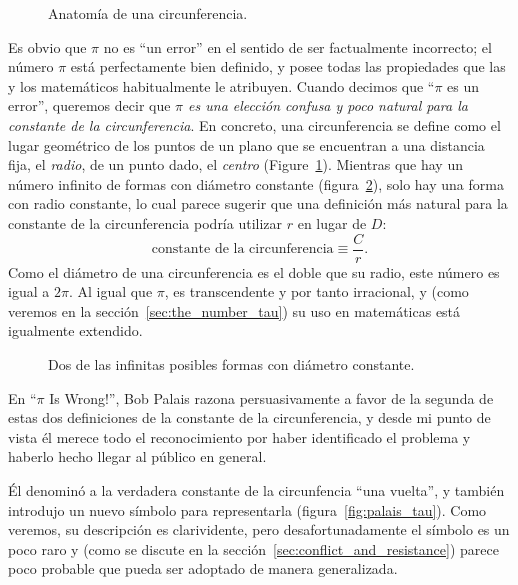 \begin{figure}
\caption{Anatomía de una circunferencia.\label{fig:circle}}
\end{figure}

Es obvio que $\pi$ no es ``un error'' en el sentido de ser factualmente incorrecto; el número $\pi$ está perfectamente bien definido, y posee todas las propiedades que las y los matemáticos habitualmente le atribuyen. Cuando decimos que ``$\pi$ es un error'', queremos decir que \emph{$\pi$ es una elección confusa y poco natural para la constante de la circunferencia}. En concreto, una circunferencia se define como el lugar geométrico de los puntos de un plano que se encuentran a una distancia fija, el \emph{radio}, de un punto dado, el \emph{centro} (Figure~\ref{fig:circle}). Mientras que hay un número infinito de formas con diámetro constante (figura~\ref{fig:bicycle_constant_diameters}), solo hay una forma con radio constante, lo cual parece sugerir que una definición más natural para la constante de la circunferencia podría utilizar $r$ en lugar de $D$:
\begin{equation}
\label{eq:circle_constant}
\mbox{constante de la circunferencia} \equiv \frac{C}{r}.
\end{equation}
Como el diámetro de una circunferencia es el doble que su radio, este número es igual a $2\pi$. Al igual que $\pi$, es transcendente y por tanto irracional, y (como veremos en la sección~\ref{sec:the_number_tau}) su uso en matemáticas está igualmente extendido.

\begin{figure}
\caption{Dos de las infinitas posibles formas con diámetro constante.\label{fig:bicycle_constant_diameters}}
\end{figure}

En ``$\pi$ Is Wrong!'', Bob Palais razona persuasivamente a favor de la segunda de estas dos definiciones de la constante de la circunferencia, y desde mi punto de vista él merece 
todo el reconocimiento por haber identificado el problema y haberlo hecho llegar al público en general.

Él denominó a la verdadera constante de la circunfencia ``una vuelta'', y también introdujo un nuevo símbolo para representarla (figura~\ref{fig:palais_tau}). Como veremos, su descripción es clarividente, pero desafortunadamente el símbolo es un poco raro y (como se discute en la sección~\ref{sec:conflict_and_resistance}) parece poco probable que pueda ser adoptado de manera generalizada.

